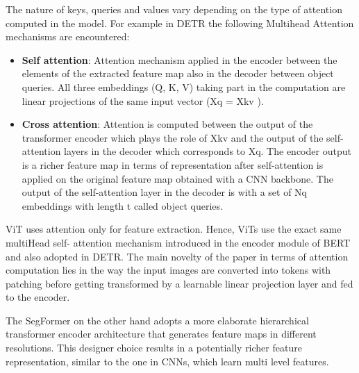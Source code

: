 The nature of keys, queries and values vary depending on the type of attention computed in the model. For example in DETR the following Multihead Attention mechanisms are encountered:
\begin{itemize}
    \item \textbf{Self attention}: Attention mechanism applied in the encoder between the elements of the extracted feature map also in the decoder between object queries. All three embeddings (Q, K, V) taking part in the computation are linear projections of the same input vector (Xq = Xkv ).
    \item \textbf{Cross attention}: Attention is computed between the output of the transformer encoder which plays the role of Xkv and the output of the self-attention layers in the decoder which corresponds to Xq. The encoder output is  a richer feature map in terms of representation after self-attention is applied on the original feature map obtained with a CNN backbone.  The output of the self-attention layer in the decoder is  with a set of Nq embeddings with length t called object queries. 
\end{itemize}

ViT uses attention only for feature extraction. Hence, ViTs use the exact same multiHead self- attention mechanism introduced in the encoder module of BERT and also adopted in DETR. The main novelty of the paper in terms of attention computation lies in the way the input images are converted into tokens with patching before getting transformed by a
learnable linear projection layer and fed to the encoder. \par
The SegFormer on the other hand adopts a more elaborate hierarchical transformer encoder architecture that generates feature maps in different resolutions. This designer choice results in a potentially richer feature representation, similar to the one in CNNs, which learn multi level features. \par


